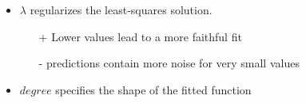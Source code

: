 \documentclass[10pt,aspectratio=169,handout]{beamer}
\begin{document}
\begin{frame}
\begin{columns}
    \begin{column}{0.36\textwidth}
        \begin{itemize}
            \item $\lambda$ regularizes the least-squares solution.
            \begin{itemize}
                \item[+] Lower values lead to a more faithful fit
                \item[-] predictions contain more noise for very small values
            \end{itemize}
            \item $degree$ specifies the shape of the fitted function
        \end{itemize}
    \end{column}
    \end{columns}
\end{frame}
\end{document}
